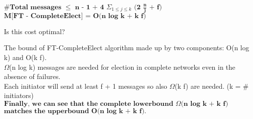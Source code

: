 \documentclass{beamer}
\begin{document}
\begin{frame}
\small
\begin{center}
$\#\textbf{Total messages}$ $\leq$ $\textbf{n - 1 +}$ $\textbf{4}$ $\Sigma_{1 \leq j \leq k}\textbf{ (2 }\frac{\textbf{n}}{\textbf{j}}$ $\textbf{+ f)}$ \\
\medskip
$\textbf{M[FT - CompleteElect] = O(n log k + k f)}$
\end{center}
\begin{block}{}
Is this cost optimal?
\end{block}
The bound of FT-CompleteElect algorithm made up by two components: O(n log k) and O(k f).\\
\medskip
$\Omega$(n log k) messages are needed for election in complete networks even in the absence of failures.\\
\medskip
Each initiator will send at least f + 1 messages so also $\Omega$(k f) are needed. (k = $\#$initiators)
\\ \medskip
$\textbf{Finally, we can see that the complete lowerbound }\Omega\textbf{(n log k + k f)}$ $\textbf{matches the upperbound O(n log k + k f).}$
\end{frame}
\end{document}
